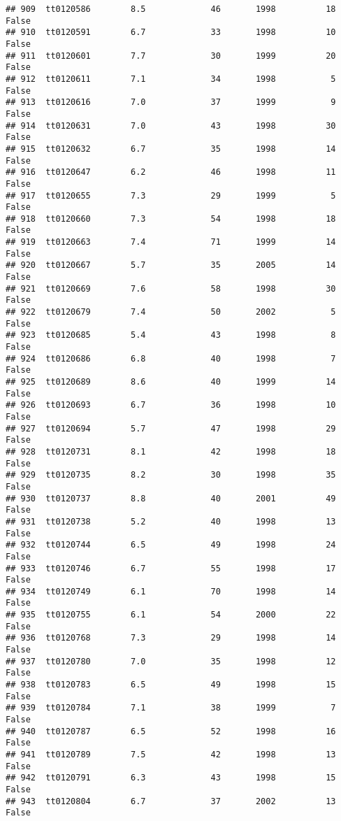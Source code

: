\documentclass[
]{article}
\begin{document}
\begin{verbatim}
## 909  tt0120586        8.5             46       1998          18   False
## 910  tt0120591        6.7             33       1998          10   False
## 911  tt0120601        7.7             30       1999          20   False
## 912  tt0120611        7.1             34       1998           5   False
## 913  tt0120616        7.0             37       1999           9   False
## 914  tt0120631        7.0             43       1998          30   False
## 915  tt0120632        6.7             35       1998          14   False
## 916  tt0120647        6.2             46       1998          11   False
## 917  tt0120655        7.3             29       1999           5   False
## 918  tt0120660        7.3             54       1998          18   False
## 919  tt0120663        7.4             71       1999          14   False
## 920  tt0120667        5.7             35       2005          14   False
## 921  tt0120669        7.6             58       1998          30   False
## 922  tt0120679        7.4             50       2002           5   False
## 923  tt0120685        5.4             43       1998           8   False
## 924  tt0120686        6.8             40       1998           7   False
## 925  tt0120689        8.6             40       1999          14   False
## 926  tt0120693        6.7             36       1998          10   False
## 927  tt0120694        5.7             47       1998          29   False
## 928  tt0120731        8.1             42       1998          18   False
## 929  tt0120735        8.2             30       1998          35   False
## 930  tt0120737        8.8             40       2001          49   False
## 931  tt0120738        5.2             40       1998          13   False
## 932  tt0120744        6.5             49       1998          24   False
## 933  tt0120746        6.7             55       1998          17   False
## 934  tt0120749        6.1             70       1998          14   False
## 935  tt0120755        6.1             54       2000          22   False
## 936  tt0120768        7.3             29       1998          14   False
## 937  tt0120780        7.0             35       1998          12   False
## 938  tt0120783        6.5             49       1998          15   False
## 939  tt0120784        7.1             38       1999           7   False
## 940  tt0120787        6.5             52       1998          16   False
## 941  tt0120789        7.5             42       1998          13   False
## 942  tt0120791        6.3             43       1998          15   False
## 943  tt0120804        6.7             37       2002          13   False

\end{verbatim}
\end{document}
